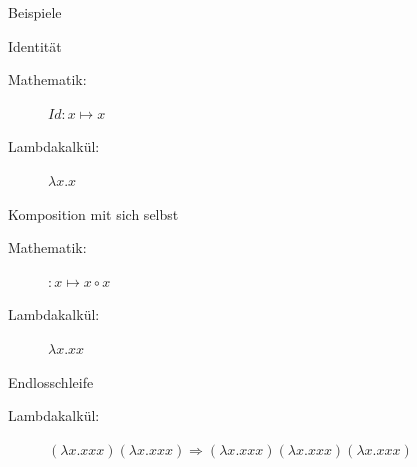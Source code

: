 \documentclass[18pt]{beamer}
\begin{document}

	\begin{frame}{Beispiele}
		\begin{exampleblock}{Identität}
			\begin{description}
				\item[Mathematik:] $Id: x \mapsto x$
				\item[Lambdakalkül:] $\lambda x.x$
			\end{description}
		\end{exampleblock}
		\pause
		\begin{exampleblock}{Komposition mit sich selbst}
			\begin{description}
				\item[Mathematik:] $: x \mapsto x \circ x$
				\item[Lambdakalkül:] $\lambda x.x x$
			\end{description}
		\end{exampleblock}
		\pause
		\begin{exampleblock}{Endlosschleife}
			\begin{description}
				\item[Lambdakalkül:] $(\lambda x.x x x)(\lambda x.x x x) \Rightarrow (\lambda x.x x x)(\lambda x.x x x)(\lambda x.x x x)$
			\end{description}
		\end{exampleblock}
	\end{frame}
\end{document}

